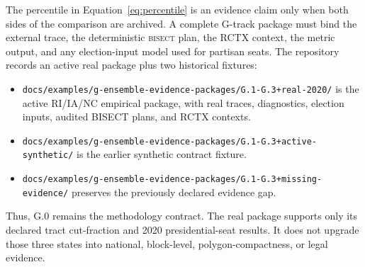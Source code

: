 The percentile in Equation~\ref{eq:percentile} is an evidence claim only when
both sides of the comparison are archived.  A complete G-track package must bind
the external trace, the deterministic \textsc{bisect} plan, the RCTX context, the
metric output, and any election-input model used for partisan seats.  The
repository records an active real package plus two historical fixtures:
\begin{itemize}
  \item \texttt{docs/examples/g-ensemble-evidence-packages/G.1-G.3+real-2020/}
    is the active RI/IA/NC empirical package, with real traces, diagnostics,
    election inputs, audited BISECT plans, and RCTX contexts.
  \item \texttt{docs/examples/g-ensemble-evidence-packages/G.1-G.3+active-synthetic/}
    is the earlier synthetic contract fixture.
  \item \texttt{docs/examples/g-ensemble-evidence-packages/G.1-G.3+missing-evidence/}
    preserves the previously declared evidence gap.
\end{itemize}

Thus, G.0 remains the methodology contract. The real package supports only its
declared tract cut-fraction and 2020 presidential-seat results. It does not
upgrade those three states into national, block-level, polygon-compactness, or
legal evidence.
